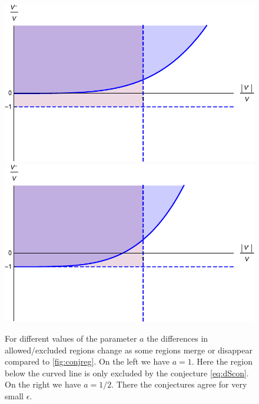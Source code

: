 \documentclass[12pt]{report}
\begin{document}
\begin{figure}[htp]
     \centering
     \includegraphics[scale=0.6]{conreg1.pdf}
     \includegraphics[scale=0.6]{conreg2.pdf}
     \caption{For different values of the parameter $a$ the differences in allowed/excluded regions change as some regions merge or disappear compared to \ref{fig:conjreg}. On the left we have $a = 1$. Here the region below the curved line is only excluded by the conjecture \eqref{eq:dScon}. On the right we have $a=1/2$. There the conjectures agree for very small $\epsilon$.}
     \label{fig:conjreg2}
\end{figure}
\end{document}
